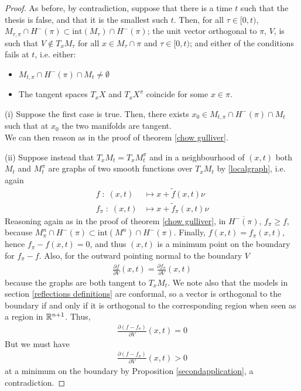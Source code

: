 \begin{proof}
	As before, by contradiction, suppose that there is a time $t$ such that the thesis is false, and that it is the smallest such $t$. Then, for all $\tau \in [0,t)$, $M_{\tau,\pi}\cap H^-(\pi)\subset \mathrm{int}(M_{\tau})\cap H^-(\pi)$; the unit vector orthogonal to $\pi$, $V$, is such that $V\notin T_xM_\tau$ for all $x\in M_\tau\cap \pi$ and $\tau \in [0,t)$; and either of the conditions fails at $t$, i.e. either: 
	\begin{itemize}
		\item[(i)] $M_{t,\pi}\cap H^-(\pi)\cap M_{t}\neq \emptyset$
		\item[(ii)] The tangent spaces $T_xX$ and $T_xX^\pi$ coincide for some $x\in\pi$. 
	\end{itemize} 
	
	(i) Suppose the first case is true. Then, there exists $x_0 \in M_{t,\pi}\cap H^-(\pi)\cap M_{t}$ such that at $x_0$ the two manifolds are tangent. \\
	We can then reason as in the proof of theorem \ref{chow gulliver}.
	
	(ii) Suppose instead that  $T_xM_t= T_xM_t^\pi$ and in a neighbourhood of $(x, t)$ both $M_t$ and $M_t^\pi$ are graphs of two smooth functions over $T_xM_t$ by \ref{localgraph}, i.e. again
	\begin{align*}
		f \; : \; (x, t) &\mapsto x+\tilde{f}(x, t)\nu \\
		f_\pi \; : \; (x, t) &\mapsto x+\tilde{f}_\pi(x, t)\nu 
	\end{align*} 
	Reasoning again as in the proof of theorem \ref{chow gulliver}, in $\overline{H^-(\pi)}$, $f_\pi\geq f$, because $M^n_\pi\cap H^-(\pi)\subset \mathrm{int}(M^n)\cap H^-(\pi)$. Finally, $f(x, t)=f_\pi (x, t)$, hence $f_\pi-f (x, t)=0$, and thus  $(x, t)$ is a minimum point on the boundary for $f_\pi-f$. Also, for the outward pointing normal to the boundary $V$
	\begin{align*}
		\frac{\partial f}{\partial V}(x,t)=\frac{\partial f_\pi}{\partial V}(x,t)
	\end{align*}
	because the graphs are both tangent to $T_xM_t$. We note also that the models in section \ref{reflections definitions} are conformal, so a vector is orthogonal to the boundary if and only if it is orthogonal to the corresponding region when seen as a region in $\mathbb{R}^{n+1}$. Thus, 
	\begin{align*}
		\frac{\partial (f- f_\pi)}{\partial V}(x,t)=0
	\end{align*}
	But we must have 
	\begin{align*}
		\frac{\partial (f- f_\pi)}{\partial V}(x,t)>0
	\end{align*}
	at a minimum on the boundary by Proposition \ref{secondapplication}, a contradiction.  
\end{proof}